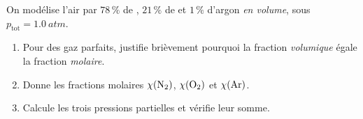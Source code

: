 \documentclass[11pt,a4paper]{article}
\begin{document}
\begin{exo}
On modélise l'air par $78\,\%$ de , $21\,\%$ de  et $1\,\%$ d'argon  \emph{en
volume}, sous $p_{\text{tot}}=\qty{1.0}{atm}$.
\begin{enumerate}[label=\alph*)]
  \item Pour des gaz parfaits, justifie brièvement pourquoi la fraction \emph{volumique} égale la
        fraction \emph{molaire}.
  \item Donne les fractions molaires $\chi(\ce{N2})$, $\chi(\ce{O2})$ et $\chi(\ce{Ar})$.
  \item Calcule les trois pressions partielles et vérifie leur somme.
\end{enumerate}
\end{exo}
\end{document}
